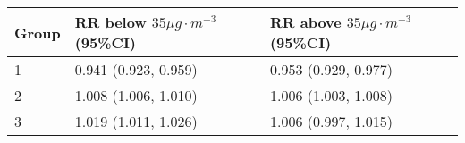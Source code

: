 \begin{tabular}{lll}
  \hline
Group & RR below $35 \mu g \cdot m^{-3}$ (95\%CI) & RR above $35 \mu g \cdot m^{-3}$ (95\%CI) \\ 
  \hline
   1 & 0.941 (0.923, 0.959) & 0.953 (0.929, 0.977) \\ 
     2 & 1.008 (1.006, 1.010) & 1.006 (1.003, 1.008) \\ 
     3 & 1.019 (1.011, 1.026) & 1.006 (0.997, 1.015) \\ 
   \hline
\end{tabular}

